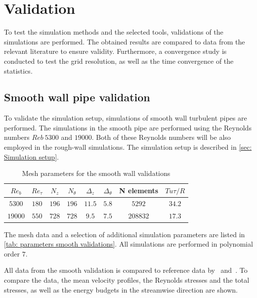 \chapter{Validation} \label{chap: Validation}
To test the simulation methods and the selected tools, validations of the simulations are performed.
The obtained results are compared to data from the relevant literature to ensure validity.
Furthermore, a convergence study is conducted to test the grid resolution, as well as the time convergence of the statistics.

 
\section{Smooth wall pipe validation}\label{sec: Smooth wall pipe}
To validate the simulation setup, simulations of smooth wall turbulent pipes are performed.
The simulations in the smooth pipe are performed using the Reynolds numbers $Reb \ 5300$ and $19000$.
Both of these Reynolds numbers  will be also employed in the rough-wall simulations.
The simulation setup is described in \autoref{sec: Simulation setup}.
\begin{table}
    \centering
    \caption{Mesh parameters for the smooth wall validations}
    \begin{tabular}{c c c c c c c c}
        \hline
        $Re_b$  & $Re_\tau$ & $N_z$ & $N_\theta$ & $\Delta_z$    & $\Delta_\theta$  & N elements    & $Tu\tau / R$\\
        \hline
        $5300$  & $180$     & $196$ & $196$     & $11.5$        & $5.8$             & $5292$        & $34.2$\\
        $19000$ & $550$     & $728$ & $728$     & $9.5$         & $7.5$             & $208832$      & $17.3$\\
        \hline
    \end{tabular}
    \label{tab: parameters smooth validations}
\end{table}
The mesh data and a selection of additional simulation parameters are listed in \autoref{tab: parameters smooth validations}.
All simulations are performed in polynomial order $7$.

All data from the smooth validation is compared to reference data by~\cite{yaoDirectNumericalSimulations2023} and~\cite{elkhouryDirectNumericalSimulation2013}.
To compare the data, the mean velocity profiles, the Reynolds stresses and the total stresses, as well as the energy budgets in the streamwise direction are shown.


